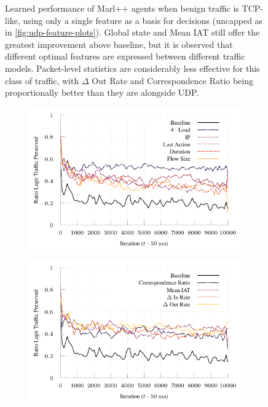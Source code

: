\documentclass[conference, letterpaper, 10pt, times]{IEEEtran}
\begin{document}
\begin{figure}
	\caption{
		Learned performance of Marl++ agents when benign traffic is TCP-like, using only a single feature as a basis for decisions (uncapped as in \cref{fig:udp-feature-plots}).
		Global state and Mean IAT still offer the greatest improvement above baseline, but it is observed that different optimal features are expressed between different traffic models.
		Packet-level statistics are considerably less effective for this class of traffic, with $\Delta$ Out Rate and Correspondence Ratio being proportionally better than they are alongside UDP.
		\label{fig:tcp-feature-plots}
	}
\end{figure}

\begin{figure}
	\begin{subfigure}{0.32\linewidth}
		\includegraphics[width=\linewidth]{../plots/ftprep-tcp-cap-good}
	\end{subfigure}
	\begin{subfigure}{0.32\linewidth}
		\includegraphics[width=\linewidth]{../plots/ftprep-tcp-cap-good-2}

\end{subfigure}
\end{figure}
\end{document}
